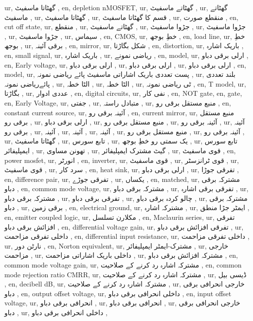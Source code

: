 ur, گھٹاتا ماسفیٹ ,
en, depletion nMOSFET,
ur, گھٹاتے ماسفیٹ ,
ur, گھٹاتے ماسفیٹ ,
ur, گھٹاتا ماسفیٹ ,
ur, قسم کا گھٹاتا ماسفیٹ ,
ur, منقطع صورت ,
en, cut off state,
ur, منقطع ,
ur, گھٹاتے ماسفیٹ ,
ur, جڑوا ماسفیٹ ,
ur, جڑوا ماسفیٹ ,
ur, جڑوا ماسفیٹ ,
ur, سیماس ,
en, CMOS,
ur, خطِ بوجھ ,
en, load line,
ur, خطِ بوجھ ,
ur, برقی آئینہ ,
en, mirror,
ur, شکل بگاڑتا ,
en, distortion,
ur, باریک اشارہ ,
en, small signal,
ur, باریک اشارہ ,
ur, ریاضی نمونے ,
en, model,
ur, ارلی برقی دباو ,
en, Early voltage,
ur, ارلی برقی دباو ,
ur, ارلی برقی دباو ,
ur, ارلی برقی دباو ,
en, model,
ur, پست تعددی باریک اشاراتی ماسفیٹ پائے ریاضی نمونہ ,
ur, بلند تعددی پائےریاضی نمونہ ,
ur, الٹا خطہ ,
ur, الٹا خطہ ,
ur, ٹی ریاضی نمونہ ,
en, T model,
ur, بگاڑتا ,
ur, عددی ادوار ,
en, digital circuits,
ur, نفی کار ,
en, NOT gate,
en, gate,
en, Early Voltage,
ur, جفتی ,
ur, متبادل راستہ ,
ur, منبع مستقل برقی رو ,
en, constant current source,
ur, آئینہ برقی رو ,
en, current mirror,
ur, منبع مستقل برقی رو ,
ur, ارلی برقی دباو ,
ur, منبع مستقل برقی رو ,
ur, آئینہ برقی رو ,
ur, آئینہ برقی رو ,
ur, آئینہ ,
ur, آئینہ ,
ur, آئینہ ,
ur, منبع مستقل برقی رو ,
ur, آئینہ برقی رو ,
ur, گھٹاتا ماسفیٹ ,
ur, تابع سورس ,
ur, یک سمتی رو خطِ بوجھ ,
ur, تابع سورس ایمپلیفائر ,
ur, تھونن مساوی ,
ur, گیٹ مشترک ایمپلیفائر ,
ur, قوی ماسفیٹ ,
en, power mosfet,
ur, انورٹر ,
en, inverter,
ur, قوی ماسفیٹ ,
ur, قوی ٹرانزسٹر ,
ur, قوی ماسفیٹ ,
ur, سرد کار ,
en, heat sink,
ur, ارلی برقی دباو ,
ur, تفرقی جوڑا ,
en, difference pair,
ur, تفرقی جوڑے ,
ur, یکساں ,
en, matched,
ur, مشترکہ برقی دباو ,
en, common mode voltage,
ur, مشترکہ برقی دباو ,
ur, تفرقی برقی اشارہ ,
ur, مشترکہ برقی دباو ,
ur, تفرقی برقی دباو ,
ur, چالو کردہ برقی دباو ,
ur, مشترکہ برقی دباو ,
ur, برقی زمین ,
en, electrical ground,
ur, مشترکہ اشارہ ,
ur, ایمٹر جڑا منطق ,
en, emitter coupled logic,
ur, مکلارن تسلسل ,
en, Maclaurin series,
ur, تفرقی افزائش برقی دباو ,
en, differential voltage gain,
ur, تفرقی افزائش برقی دباو ,
ur, داخلی تفرقی مزاحمت ,
en, differential input resistance,
ur, داخلی تفرقی مزاحمت ,
ur, نارٹن دور ,
en, Norton equivalent,
ur, مشترک-ایمٹر ایمپلیفائر ,
ur, خارجی مزاحمت ,
ur, داخلی باریک اشاراتی مزاحمت ,
ur, مشترکہ افزائش برقی دباو ,
en, common mode voltage gain,
ur, مشترکہ اشارہ رد کرنے کے صلاحیت ,
en, common mode rejection ratio CMRR,
ur, مشترکہ اشارہ رد کرنے کے صلاحیت ,
ur, ڈیسی بیل ,
en, decibell dB,
ur, مشترکہ اشارہ رد کرنے کے صلاحیت ,
ur, خارجی انحرافی برقی دباو ,
en, output offset voltage,
ur, داخلی انحرافی برقی دباو ,
en, input offset voltage,
ur, انحرافی برقی دباو ,
ur, انحرافی برقی دباو ,
ur, خارجی انحرافی برقی دباو ,
ur, داخلی انحرافی برقی دباو ,
